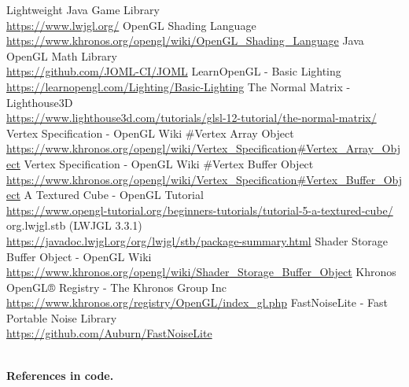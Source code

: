 \documentclass{article}
\begin{document}
    \newpage
    
    \begin{thebibliography}{9}
        
        Lightweight Java Game Library \\
        \url{https://www.lwjgl.org/}
        OpenGL Shading Language \\
        \url{https://www.khronos.org/opengl/wiki/OpenGL_Shading_Language}
        Java OpenGL Math Library \\
        \url{https://github.com/JOML-CI/JOML}
        LearnOpenGL - Basic Lighting \\
        \url{https://learnopengl.com/Lighting/Basic-Lighting}
        The Normal Matrix - Lighthouse3D \\
        \url{https://www.lighthouse3d.com/tutorials/glsl-12-tutorial/the-normal-matrix/}
        Vertex Specification - OpenGL Wiki \#Vertex Array Object \\
        \url{https://www.khronos.org/opengl/wiki/Vertex_Specification#Vertex_Array_Object}
        Vertex Specification - OpenGL Wiki \#Vertex Buffer Object \\
        \url{https://www.khronos.org/opengl/wiki/Vertex_Specification#Vertex_Buffer_Object}
        A Textured Cube - OpenGL Tutorial \\
        \url{https://www.opengl-tutorial.org/beginners-tutorials/tutorial-5-a-textured-cube/}
        org.lwjgl.stb (LWJGL 3.3.1) \\
        \url{https://javadoc.lwjgl.org/org/lwjgl/stb/package-summary.html}
        Shader Storage Buffer Object - OpenGL Wiki \\
        \url{https://www.khronos.org/opengl/wiki/Shader_Storage_Buffer_Object}
        Khronos OpenGL® Registry - The Khronos Group Inc \\
        \url{https://www.khronos.org/registry/OpenGL/index_gl.php}
        FastNoiseLite - Fast Portable Noise Library\\
        \url{https://github.com/Auburn/FastNoiseLite}

        \textbf{\\ References in code.}


\end{thebibliography}
\end{document}
